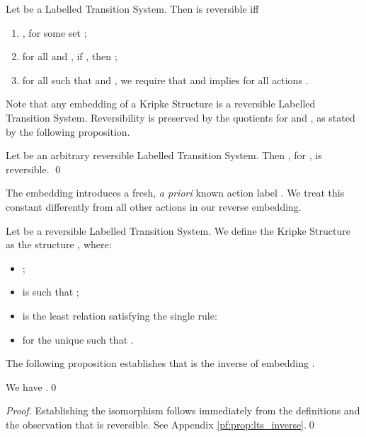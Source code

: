 \documentclass{llncs}
\begin{document}
\begin{definition}
Let  be a Labelled Transition System.
Then  is reversible iff
\begin{enumerate}
\item , for some set ;

\item for all  and ,
if , then ;

\item for all  such that  and
, we require that
 and  implies  for all
actions .

\end{enumerate}
\end{definition}
Note that any embedding  of a Kripke Structure 
is a reversible Labelled Transition System. Reversibility
is preserved by the quotients for  and ,
as stated by the following proposition.
\begin{proposition}
\label{prop:reversibility}
Let  be an arbitrary reversible Labelled Transition
System. Then , for ,
is reversible. \qed

\end{proposition}
The embedding 
introduces a fresh, \emph{a priori} known action label .
We treat this constant differently from all other actions in
our reverse embedding.
\begin{definition}
\label{translationltsreverse}
Let  be a reversible Labelled Transition
System.
We define the Kripke Structure  as the structure
, where:
\begin{itemize}
\item ;

\item  is such that ;

\item  is the least relation satisfying the single rule:


\item  for the unique  such that .

\end{itemize}

\end{definition}

\noindent
The following proposition establishes that  is the
inverse of embedding .

\newcommand{\id}{\ensuremath{\mathsf{Id}}}
\begin{proposition}
\label{prop:lts_inverse}
We have .\qed
\end{proposition}

\begin{proof}
Establishing the isomorphism follows immediately from the definitions
and the observation that  is reversible. See Appendix \ref{pf:prop:lts_inverse}.\qed
\end{proof}
\end{document}
